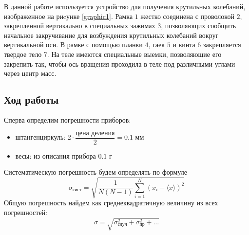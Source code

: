 \documentclass[a4paper,12pt]{article}
\begin{document}
В данной работе используется устройство для получения крутильных колебаний, изображенное на риcунке \ref{graphic1}. Рамка $1$ жестко соединена с проволокой $2$, закрепленной вертикально в специальных зажимах $3$, позволяющих сообщить начальное закручивание для возбуждения крутильных колебаний вокруг вертикальной оси. В рамке с помощью планки $4$, гаек $5$ и винта $6$ закрепляется твердое тело $7$. На теле имеются специальные выемки, позволяющие его закрепить так, чтобы ось вращения проходила в теле под различными углами через центр масс.

\subsection*{Ход работы}
Сперва определим погрешности приборов:
	\begin{itemize}
		\item штангенциркуль: $2\cdot\dfrac{\text{цена деления}}{2} = 0.1$ мм
		\item весы: из описания прибора $0.1$ г
	\end{itemize}
	Систематическую погрешность будем определять по формуле
	$$
	\sigma_{\text{сист}} = \sqrt{\frac{1}{N(N - 1)}\sum_{i = 1}^{N}(x_i - \langle x\rangle)^2}
	$$
	Общую погрешность найдем как среднеквадратичную величину из всех погрешностей:
	$$
	\sigma = \sqrt{\sigma^2_{\text{случ}} + \sigma^2_{\text{пр}} + \dots}
	$$
\end{document}

